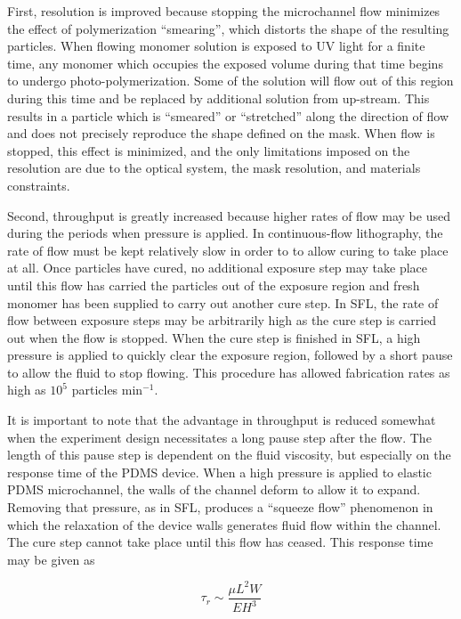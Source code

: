 First, resolution is improved because stopping the microchannel flow minimizes the effect of polymerization
``smearing'', which distorts the shape of the resulting particles.
When flowing monomer solution is exposed to UV light for a finite time, any monomer which occupies the exposed volume 
during that time begins to undergo photo-polymerization.  Some of the solution will flow out of this region 
during this time and be replaced by additional solution from up-stream. This results in a particle which is ``smeared''
or ``stretched'' along the direction of flow and does not precisely reproduce the shape defined on the mask.  
When flow is 
stopped, this effect is minimized, and the only limitations imposed on the resolution are due to the optical system,
the mask resolution, and materials constraints.

Second, throughput is greatly increased because higher rates of flow may be used during the periods when pressure is
applied.  In continuous-flow lithography, the rate of flow must be kept relatively slow 
in order to to allow curing to take place
at all.
Once particles have cured, no 
additional exposure step may take place until this flow has carried the particles out of the
exposure region and fresh monomer has been supplied to carry out another cure step.  In SFL, the rate of flow
between exposure steps
may be arbitrarily high as the cure step is carried out when the flow is stopped. 
When the cure step is finished in SFL, a high pressure is applied to quickly clear the exposure region, followed by a 
short pause to allow the fluid to stop flowing.  This procedure has allowed fabrication rates as high as 
$10^5$ particles min$^{-1}$.~\cite{dendukuri-sfl}

It is important to note 
that the advantage in throughput is reduced somewhat when the experiment design necessitates a long pause step
after the flow. The length of this pause step is dependent on the fluid viscosity, but especially on the 
response time of the PDMS device.  When a high pressure is applied to elastic PDMS microchannel, the 
walls of the channel deform to allow it to expand.  Removing that pressure, as in SFL, produces a ``squeeze flow''
phenomenon in which the relaxation of the device walls generates fluid flow within the channel. The cure step 
cannot take place until this flow has ceased.  This response time may be given as

\begin{equation}
\tau_r \sim \frac{\mu L^2 W}{EH^3}
\label{eq:resp-time}
\end{equation}

